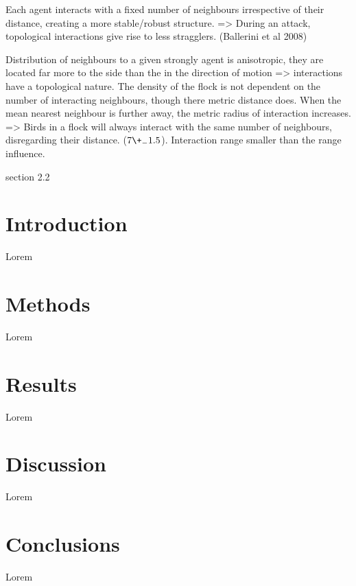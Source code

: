 \documentclass[10pt,twocolumn]{revtex4-2}    %
\begin{document}
Each agent interacts with a fixed number of neighbours irrespective of their distance, creating a more stable/robust structure. => During an attack, topological interactions give rise to less stragglers. (Ballerini et al 2008)

Distribution of neighbours to a given strongly agent is anisotropic, they are located far more to the side than the in the direction of motion => interactions have a topological nature. The density of the flock is not dependent on the number of interacting neighbours, though there metric distance does. When the mean nearest neighbour is further away, the metric radius of interaction increases. => Birds in a flock will always interact with the same number of neighbours, disregarding their distance. ($7\+_-1.5$). Interaction range smaller than the range influence.

section 2.2 








\section{Introduction} 

Lorem 

\section{Methods} 

Lorem 
 
\section{Results} 

Lorem 
\section{Discussion} 

Lorem 


\section{Conclusions}
 
Lorem 


\end{document}
